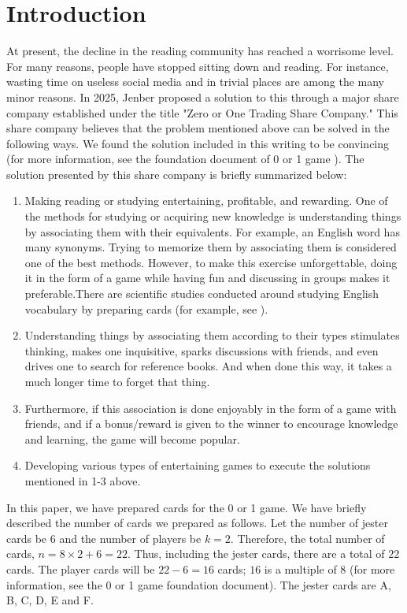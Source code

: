 \documentclass[a4paper,12pt]{article}
\theoremstyle{mystyle}
\numberwithin{equation}{section}
\numberwithin{theorem}{section}
\numberwithin{proposition}{section}
\numberwithin{example}{section}
\numberwithin{remark}{section}
\numberwithin{lemma}{section}
\numberwithin{corollary}{section}
\numberwithin{definition}{section}
\begin{document}
\section{Introduction}
\label{S:2}
At present, the decline in the reading community has reached a worrisome level. For many reasons, people have stopped sitting down and reading. For instance, wasting time on useless social media and in trivial places are among the many minor reasons. In 2025, Jenber proposed a solution to this through a major share company established under the title "Zero or One Trading Share Company." This share company believes that the problem mentioned above can be solved in the following ways. We found the solution included in this writing to be convincing (for more information, see the foundation document of 0 or 1 game \cite{ZOOTSC}). The solution presented by this share company is briefly summarized below:
\begin{enumerate}\item[(1)] Making reading or studying entertaining, profitable, and rewarding. One of the methods for studying or acquiring new knowledge is understanding things by associating them with their equivalents. For example, an English word has many synonyms. Trying to memorize them by associating them is considered one of the best methods. However, to make this exercise unforgettable, doing it in the form of a game while having fun and discussing in groups makes it preferable.There are scientific studies conducted around studying English vocabulary by preparing cards (for example, see \cite{aslan2011teaching,azabdaftari2012comparing,bryson2012using,kosim2013improving,nikoopour2014vocabulary,nugroho2012improving,saputri2017improving,senzaki2017reinventing,sitompul2013teaching,wahyuni2014flashcards}).
\item[(2)] Understanding things by associating them according to their types stimulates thinking, makes one inquisitive, sparks discussions with friends, and even drives one to search for reference books. And when done this way, it takes a much longer time to forget that thing.
\item[(3)] Furthermore, if this association is done enjoyably in the form of a game with friends, and if a bonus/reward is given to the winner to encourage knowledge and learning, the game will become popular.
\item[(4)] Developing various types of entertaining games to execute the solutions mentioned in 1-3 above.
\end{enumerate}
In this paper, we have prepared cards for the 0 or 1 game. We have briefly described the number of cards we prepared as follows. Let the number of jester cards be $6$ and the number of players be $k = 2$. Therefore, the total number of cards, $n = 8 \times 2 + 6 = 22$. Thus, including the jester cards, there are a total of $22$ cards. The player cards will be $22 - 6 = 16$ cards; $16$ is a multiple of $8$ (for more information, see the 0 or 1 game foundation document). The jester cards are A, B, C, D, E and F.
\end{document}
